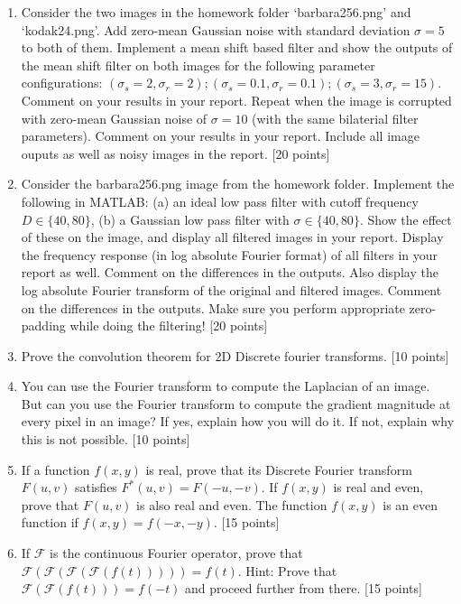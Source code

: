 \documentclass[11pt]{article}
\begin{document}
\begin{enumerate}
\item Consider the two images in the homework folder `barbara256.png' and `kodak24.png'. Add zero-mean Gaussian noise with standard deviation $\sigma = 5$ to both of them. Implement a mean shift based filter and show the outputs of the mean shift filter on both images for the following parameter configurations: $(\sigma_s = 2, \sigma_r = 2); (\sigma_s = 0.1, \sigma_r = 0.1); (\sigma_s = 3, \sigma_r = 15)$. Comment on your results in your report. Repeat when the image is corrupted with zero-mean Gaussian noise of $\sigma = 10$ (with the same bilaterial filter parameters). Comment on your results in your report. Include all image ouputs as well as noisy images in the report. \textsf{[20 points]}

\item Consider the barbara256.png image from the homework folder. Implement the following in MATLAB: (a) an ideal low pass filter with cutoff frequency $D \in \{40, 80\}$, (b) a Gaussian low pass filter with $\sigma \in \{40,80\}$. Show the effect of these on the image, and display all filtered images in your report. Display the frequency response (in log absolute Fourier format) of all filters in your report as well. Comment on the differences in the outputs. Also display the log absolute Fourier transform of the original and filtered images. Comment on the differences in the outputs. Make sure you perform appropriate zero-padding while doing the filtering! \textsf{[20 points]}

\item Prove the convolution theorem for 2D Discrete fourier transforms. \textsf{[10 points]}

\item You can use the Fourier transform to compute the Laplacian of an image. But can you use the Fourier transform to compute the gradient magnitude at every pixel in an image? If yes, explain how you will do it. If not, explain why this is not possible. \textsf{[10 points]}

\item If a function $f(x,y)$ is real, prove that its Discrete Fourier transform $F(u,v)$ satisfies $F^*(u,v) = F(-u,-v)$. If $f(x,y)$ is real and even, prove that $F(u,v)$ is also real and even. The function $f(x,y)$ is an even function if $f(x,y) = f(-x,-y)$. \textsf{[15 points]}

\item If $\mathcal{F}$ is the continuous Fourier operator, prove that $\mathcal{F}(\mathcal{F}(\mathcal{F}(\mathcal{F}(f(t))))) = f(t)$. Hint: Prove that $\mathcal{F}(\mathcal{F}(f(t))) = f(-t)$ and proceed further from there. \textsf{[15 points]}


\end{enumerate}
\end{document}
